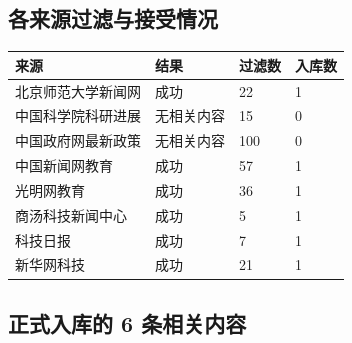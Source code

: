 \documentclass[UTF8,11pt,a4paper,fontset=none]{ctexart}
\begin{document}
\subsection{各来源过滤与接受情况}

\noindent\begin{tabularx}{\textwidth}{L{4.2cm}L{3.0cm}L{2.5cm}Y}
\toprule
{}
\color{white}\bfseries 来源 & \color{white}\bfseries 结果 &
\color{white}\bfseries 过滤数 & \color{white}\bfseries 入库数 \\
\midrule
北京师范大学新闻网 & 成功 & 22 & 1 \\
中国科学院科研进展 & 无相关内容 & 15 & 0 \\
中国政府网最新政策 & 无相关内容 & 100 & 0 \\
中国新闻网教育 & 成功 & 57 & 1 \\
光明网教育 & 成功 & 36 & 1 \\
商汤科技新闻中心 & 成功 & 5 & 1 \\
科技日报 & 成功 & 7 & 1 \\
新华网科技 & 成功 & 21 & 1 \\
\bottomrule
\end{tabularx}

\subsection{正式入库的 6 条相关内容}
\end{document}
